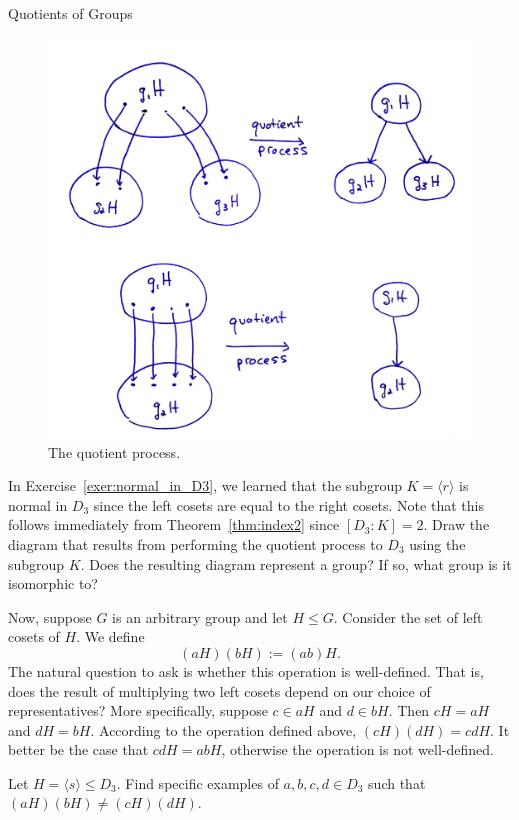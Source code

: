 \begin{section}{Quotients of Groups}
\begin{figure}[!ht]
\centering
\includegraphics[width=5in]{QuotientProcess.png}
\caption{The quotient process.}
\label{fig:quotient_process}
\end{figure}

\begin{exercise}
In Exercise~\ref{exer:normal_in_D3}, we learned that the subgroup $K=\langle r\rangle$ is normal in $D_3$ since the left cosets are equal to the right cosets.  Note that this follows immediately from Theorem~\ref{thm:index2} since $[D_3:K]=2$.  Draw the diagram that results from performing the quotient process to $D_3$ using the subgroup $K$.  Does the resulting diagram represent a group?  If so, what group is it isomorphic to?
\end{exercise}

Now, suppose $G$ is an arbitrary group and let $H\leq G$. Consider the set of left cosets of $H$.  We define
\[
(aH)(bH):=(ab)H.
\]
The natural question to ask is whether this operation is well-defined.  That is, does the result of multiplying two left cosets depend on our choice of representatives?  More specifically, suppose $c\in aH$ and $d\in bH$.  Then $cH=aH$ and $dH=bH$.  According to the operation defined above, $(cH)(dH)=cdH$.  It better be the case that $cdH=abH$, otherwise the operation is not well-defined.

\begin{exercise}
Let $H=\langle s\rangle \leq D_3$.  Find specific examples of $a,b,c,d\in D_3$ such that $(aH)(bH)\neq (cH)(dH)$.
\end{exercise}


\end{section}
